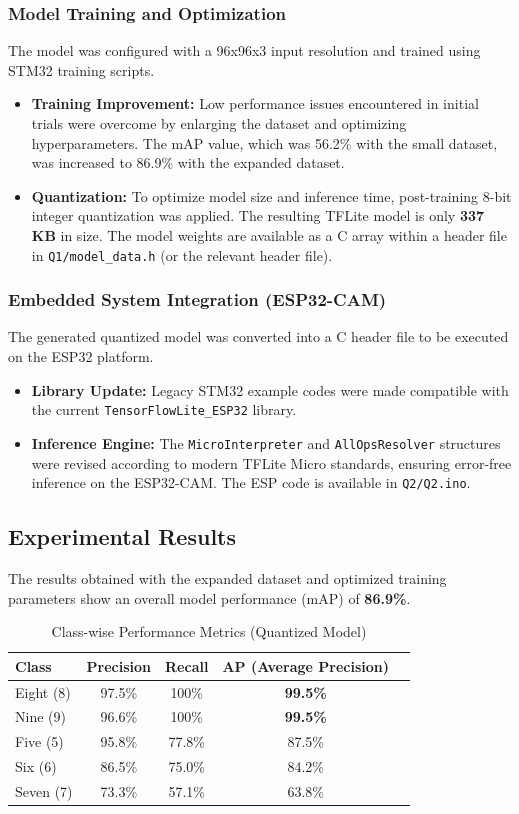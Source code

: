 \subsubsection{Model Training and Optimization}
The model was configured with a 96x96x3 input resolution and trained using STM32 training scripts.
\begin{itemize}
    \item \textbf{Training Improvement:} Low performance issues encountered in initial trials were overcome by enlarging the dataset and optimizing hyperparameters. The mAP value, which was 56.2\% with the small dataset, was increased to 86.9\% with the expanded dataset.
    \item \textbf{Quantization:} To optimize model size and inference time, post-training 8-bit integer quantization was applied. The resulting TFLite model is only \textbf{337 KB} in size. The model weights are available as a C array within a header file in \texttt{Q1/model\_data.h} (or the relevant header file).
\end{itemize}

\subsubsection{Embedded System Integration (ESP32-CAM)}
The generated quantized model was converted into a C header file to be executed on the ESP32 platform.
\begin{itemize}
    \item \textbf{Library Update:} Legacy STM32 example codes were made compatible with the current \texttt{TensorFlowLite\_ESP32} library.
    \item \textbf{Inference Engine:} The \texttt{MicroInterpreter} and \texttt{AllOpsResolver} structures were revised according to modern TFLite Micro standards, ensuring error-free inference on the ESP32-CAM. The ESP code is available in \texttt{Q2/Q2.ino}.
\end{itemize}

\subsection{Experimental Results}
The results obtained with the expanded dataset and optimized training parameters show an overall model performance (mAP) of \textbf{86.9\%}.

\begin{table}[h]
\centering
\caption{Class-wise Performance Metrics (Quantized Model)}
\label{tab:results}
\begin{tabular}{@{}lcccc@{}}
\toprule
\textbf{Class} & \textbf{Precision} & \textbf{Recall} & \textbf{AP (Average Precision)} \\ \midrule
Eight (8) & 97.5\% & 100\% & \textbf{99.5\%} \\
Nine (9)  & 96.6\% & 100\% & \textbf{99.5\%} \\
Five (5)  & 95.8\% & 77.8\% & 87.5\% \\
Six (6)   & 86.5\% & 75.0\% & 84.2\% \\
Seven (7) & 73.3\% & 57.1\% & 63.8\% \\ \bottomrule
\end{tabular}
\end{table}

